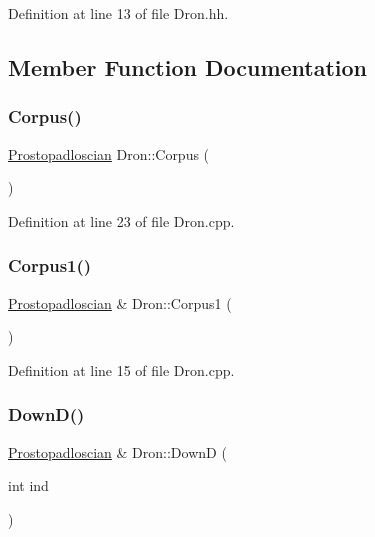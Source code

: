 Definition at line 13 of file Dron.\+hh.



\subsection{Member Function Documentation}
\mbox{\label{class_dron_accc0e928bc7c9c66c779793fd41a81ee}} 
\subsubsection{\texorpdfstring{Corpus()}{Corpus()}}
{\footnotesize\ttfamily \hyperlink{class_prostopadloscian}{Prostopadloscian} Dron\+::\+Corpus (\begin{DoxyParamCaption}{ }\end{DoxyParamCaption})}



Definition at line 23 of file Dron.\+cpp.

\mbox{\label{class_dron_ad6273a0942af9e85cf4fa039b36a1f05}} 
\subsubsection{\texorpdfstring{Corpus1()}{Corpus1()}}
{\footnotesize\ttfamily \hyperlink{class_prostopadloscian}{Prostopadloscian} \& Dron\+::\+Corpus1 (\begin{DoxyParamCaption}{ }\end{DoxyParamCaption})}



Definition at line 15 of file Dron.\+cpp.

\mbox{\label{class_dron_ad7c1cbee3550365921052076d7345e5f}} 
\subsubsection{\texorpdfstring{Down\+D()}{DownD()}}
{\footnotesize\ttfamily \hyperlink{class_prostopadloscian}{Prostopadloscian} \& Dron\+::\+DownD (\begin{DoxyParamCaption}\item[{int}]{ind }\end{DoxyParamCaption})}



